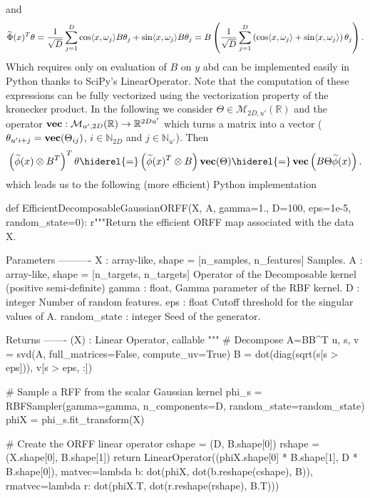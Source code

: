 and
\begin{dmath}
\label{eq:phi_transpose_efficient}
\tildePhi{\omega}(x)^T\theta = \frac{1}{\sqrt{D}} \sum_{j=1}^D \cos\inner{x, \omega_j}B\theta_j + \sin\inner{x, \omega_j}B\theta_j = B\left(\frac{1}{\sqrt{D}} \sum_{j=1}^D \left(\cos\inner{x, \omega_j} + \sin\inner{x, \omega_j}\right)\theta_j\right).
\end{dmath}
Which requires only on evaluation of $B$ on $y$ abd can be implemented easily in Python thanks to SciPy's LinearOperator. Note that the computation of these expressions can be fully vectorized using the vectorization property of the kronecker product. In the following we consider $\Theta \in \mathcal{M}_{2D,u'}(\mathbb{R})$ and the operator $\operatorname{\mathbf{vec}}: \mathcal{M}_{u',2D}(\mathbb{R}) \to \mathbb{R}^{2Du'}$ which turns a matrix into a vector (\ie~$\theta_{u'i+j} = \operatorname{\mathbf{vec}}(\Theta_{ij})$, $i\in\mathbb{N}_{2D}$ and $j\in\mathbb{N}_{u'}$). Then
\begin{dmath*}
\left(\tildephi{\omega}(x) \otimes B^T\right)^T \theta \hiderel{=} \left(\tildephi{\omega}(x)^T \otimes B\right) \vectorize(\Theta) \hiderel{=} \vectorize\left(B \Theta \tildephi{\omega}(x) \right).
\end{dmath*}
which leads us to the following (more efficient) Python implementation
\begin{pyblock}
def EfficientDecomposableGaussianORFF(X, A, gamma=1.,
                                 D=100, eps=1e-5, random_state=0):
    r"""Return the efficient ORFF map associated with the data X.

    Parameters
    ----------
    X : {array-like}, shape = [n_samples, n_features]
        Samples.
    A : {array-like}, shape = [n_targets, n_targets]
        Operator of the Decomposable kernel (positive semi-definite)
    gamma : {float},
        Gamma parameter of the RBF kernel.
    D : {integer}
        Number of random features.
    eps : {float}
        Cutoff threshold for the singular values of A.
    random_state : {integer}
        Seed of the generator.

    Returns
    -------
    \tilde{\Phi}(X) : Linear Operator, callable
    """
    # Decompose A=BB^T
    u, s, v = svd(A, full_matrices=False, compute_uv=True)
    B = dot(diag(sqrt(s[s > eps])), v[s > eps, :])

    # Sample a RFF from the scalar Gaussian kernel
    phi_s = RBFSampler(gamma=gamma, n_components=D, random_state=random_state)
    phiX = phi_s.fit_transform(X)

    # Create the ORFF linear operator
    cshape = (D, B.shape[0])
    rshape = (X.shape[0], B.shape[1])
    return LinearOperator((phiX.shape[0] * B.shape[1], D * B.shape[0]),
                          matvec=lambda b: dot(phiX, dot(b.reshape(cshape),
                                               B)),
                          rmatvec=lambda r: dot(phiX.T, dot(r.reshape(rshape),
                                                B.T)))
\end{pyblock}

